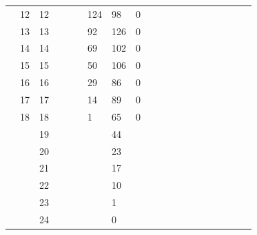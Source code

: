 \documentclass[12pt]{article}
\begin{document}
\begin{landscape}
\begin{table}[]
\begin{tabular}{l|l|l|l|l|l|l|l|l|l|llllllllll}
                   & 12      & 12      &         &        &  & 124       & 98        & 0         &          &  &  &  &  &  &  &  &  &  &  \\ \cline{2-10}
                   & 13      & 13      &         &        &  & 92        & 126       & 0         &          &  &  &  &  &  &  &  &  &  &  \\ \cline{2-10}
                   & 14      & 14      &         &        &  & 69        & 102       & 0         &          &  &  &  &  &  &  &  &  &  &  \\ \cline{2-10}
                   & 15      & 15      &         &        &  & 50        & 106       & 0         &          &  &  &  &  &  &  &  &  &  &  \\ \cline{2-10}
                   & 16      & 16      &         &        &  & 29        & 86        & 0         &          &  &  &  &  &  &  &  &  &  &  \\ \cline{2-10}
                   & 17      & 17      &         &        &  & 14        & 89        & 0         &          &  &  &  &  &  &  &  &  &  &  \\ \cline{2-10}
                   & 18      & 18      &         &        &  & 1         & 65        & 0         &          &  &  &  &  &  &  &  &  &  &  \\ \cline{2-10}
                   &         & 19      &         &        &  &           & 44        &           &          &  &  &  &  &  &  &  &  &  &  \\ \cline{2-10}
                   &         & 20      &         &        &  &           & 23        &           &          &  &  &  &  &  &  &  &  &  &  \\ \cline{2-10}
                   &         & 21      &         &        &  &           & 17        &           &          &  &  &  &  &  &  &  &  &  &  \\ \cline{2-10}
                   &         & 22      &         &        &  &           & 10        &           &          &  &  &  &  &  &  &  &  &  &  \\ \cline{2-10}
                   &         & 23      &         &        &  &           & 1         &           &          &  &  &  &  &  &  &  &  &  &  \\ \cline{2-10}
                   &         & 24      &         &        &  &           & 0         &           &          &  &  &  &  &  &  &  &  &  &  \\ \cline{2-10}
\end{tabular}
\end{table}
\end{landscape}
\pagebreak
\end{document}
